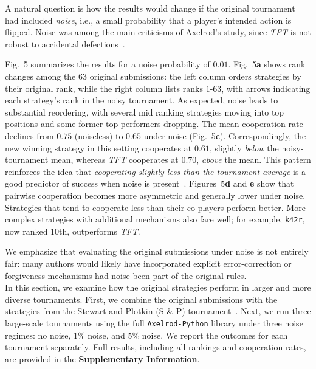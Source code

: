 \documentclass{article}
\newcommand{\TFT}{\emph{TFT}}
\newcommand{\AXL}{\texttt{Axelrod-Python}}
\newcommand{\SI}{\textbf{Supplementary Information}}
\begin{document}
A natural question is how the results would change if the original tournament
had included \emph{noise}, i.e., a small probability that a player's intended
action is flipped. Noise was among the main criticisms of Axelrod's study, since
\TFT{} is not robust to accidental defections~\cite{molander1985optimal,
bendor1993uncertainty, wu1995cope, do2017combination}.

Fig.~5 summarizes the results for a noise probability of
\(0.01\). Fig.~5\textbf{a} shows rank changes among the 63 original
submissions: the left column orders strategies by their original rank, while
the right column lists ranks \(1\)-\(63\), with arrows indicating each strategy's
rank in the noisy tournament. As expected, noise leads to substantial reordering,
with several mid ranking strategies moving into top positions and some former top performers
dropping. The mean cooperation rate declines from \(0.75\) (noiseless) to \(0.65\)
under noise (Fig.~5\textbf{c}). Correspondingly, the new
winning strategy in this setting cooperates at \(0.61\), slightly \emph{below} the
noisy-tournament mean, whereas \TFT{} cooperates at \(0.70\), \emph{above} the mean.
This pattern reinforces the idea that \emph{cooperating slightly less than the
tournament average} is a good predictor of success when noise is present~\cite{glynatsi2024properties}.
Figures~5\textbf{d} and \textbf{e} show that pairwise cooperation
becomes more asymmetric and generally lower under noise. Strategies that tend to
cooperate less than their co-players perform better. More complex strategies with
additional mechanisms also fare well; for example, \texttt{k42r}, now ranked 10th,
outperforms \TFT{}.

We emphasize that evaluating the original submissions under noise is not
entirely fair: many authors would likely have incorporated explicit
error-correction or forgiveness mechanisms had noise been part of the original
rules.\\

In this section, we examine how the original strategies perform in larger and more
diverse tournaments. First, we combine the original submissions with the strategies
from the Stewart and Plotkin (S \& P) tournament~\cite{Stewart2012}. Next, we run
three large-scale tournaments using the full \AXL{} library under three noise
regimes: no noise, \(1\%\) noise, and \(5\%\) noise. We report the outcomes for
each tournament separately. Full results, including all rankings and cooperation
rates, are provided in the \SI.
\end{document}
